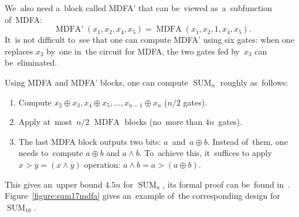 \documentclass[a4paper, UKenglish, cleveref, autoref,  thm-restate, anonymous]{lipics-v2021}
\DeclareMathOperator{\SUM}{SUM}
\DeclareMathOperator{\MDFA}{MDFA}
\begin{document}
    We~also need a~block called MDFA' that can be~viewed as~a~subfunction of~MDFA:
    \[\operatorname{MDFA'}(x_1,x_2,x_4,x_5)=\operatorname{MDFA}(x_1, x_2, 1, x_4, x_5).\]
    It~is not difficult to~see that one can compute MDFA' using six gates: when one replaces $x_3$ by~one in~the circuit for MDFA,
    the two gates fed by~$x_3$ can be~eliminated.

    Using MDFA and MDFA' blocks, one can compute $\SUM_n$ roughly as~follows:
    \begin{enumerate}
        \item Compute $x_2 \oplus x_3, x_4 \oplus x_5, \dotsc, x_{n-1} \oplus x_n$ ($n/2$ gates).
        \item Apply at~most~$n/2$ $\MDFA$ blocks (no~more than $4n$~gates).
        \item The last MDFA block outputs two bits: $a$~and~$a\oplus b$. Instead of~them, one needs to~compute $a \oplus b$ and $a \land b$. To~achieve this,
        it~suffices to apply $x>y=(x \land \overline{y})$ operation:
        \(a \land b = a>(a \oplus b)\).
    \end{enumerate}
    This gives an~upper bound $4.5n$ for $\SUM_n$, its formal proof can
    be~found in~\cite{DBLP:journals/ipl/DemenkovKKY10}.
    Figure~\ref{figure:sum17mdfa} gives an~example of~the corresponding design
    for~$\SUM_{16}$.
\end{document}
